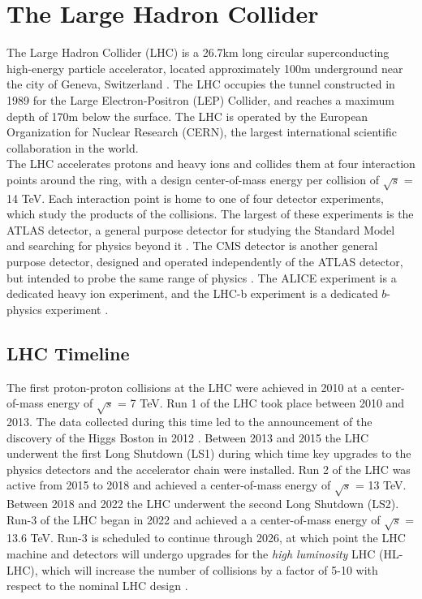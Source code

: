 \chapter{The Large Hadron Collider}
The Large Hadron Collider (LHC) is a 26.7km long circular superconducting high-energy particle accelerator, located approximately 100m underground near the city of Geneva, Switzerland \cite{LHC_machine} . The LHC occupies the tunnel constructed in 1989 for the Large Electron-Positron (LEP) Collider, and reaches a maximum depth of 170m below the surface. The LHC is operated by the European Organization for Nuclear Research (CERN), the largest international scientific collaboration in the world.\\

The LHC accelerates protons and heavy ions and collides them at four interaction points around the ring, with a design center-of-mass energy per collision of $\sqrt{s}$ = 14 TeV. Each interaction point is home to one of four detector experiments, which study the products of the collisions. The largest of these experiments is the ATLAS detector, a general purpose detector for studying the Standard Model and searching for physics beyond it \cite{ATLAS_at_LHC}. The CMS detector is another general purpose detector, designed and operated independently of the ATLAS detector, but intended to probe the same range of physics \cite{CMS_at_LHC}. The ALICE experiment is a dedicated heavy ion experiment, and the LHC-b experiment is a dedicated $b$-physics experiment  \cite{ALICE_at_LHC} \cite{LHCb_at_LHC}.\\

\section{LHC Timeline}
The first proton-proton collisions at the LHC were achieved in 2010 at a center-of-mass energy of $\sqrt{s}$ = 7 TeV. Run 1 of the LHC took place between 2010 and 2013. The data collected during this time led to the announcement of the discovery of the Higgs Boston in 2012 \cite{higgs_paper}. Between 2013 and 2015 the LHC underwent the first Long Shutdown (LS1) during which time key upgrades to the physics detectors and the accelerator chain were installed. Run 2 of the LHC was active from 2015 to 2018 and achieved a center-of-mass energy of $\sqrt{s}$ = 13 TeV. Between 2018 and 2022 the LHC underwent the second Long Shutdown (LS2). Run-3 of the LHC began in 2022 and achieved a a center-of-mass energy of $\sqrt{s}$ = 13.6 TeV. Run-3 is scheduled to continue through 2026, at which point the LHC machine and detectors will undergo upgrades for the \textit{high luminosity} LHC (HL-LHC), which will increase the number of collisions by a factor of 5-10 with respect to the nominal LHC design \cite{hl_lhc}. 

